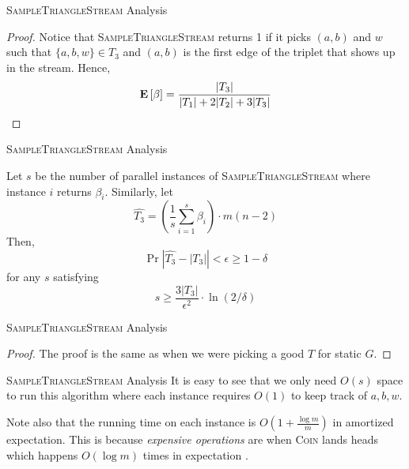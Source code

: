 \begin{frame}{\textsc{SampleTriangleStream} Analysis}
  \begin{proof}
    Notice that \textsc{SampleTriangleStream} returns 1 if it picks \((a, b)\)
    and \(w\) such that \(\{a, b, w\} \in T_3\) and \((a,
    b)\) is the first edge of the triplet that shows up in the stream. Hence,
    \[ \mathbf{E}\left[\beta\right] = \frac{|T_3|}{|T_1| + 2|T_2| + 3|T_3|} \]
  \end{proof}
\end{frame}

\begin{frame}{\textsc{SampleTriangleStream} Analysis}
  \begin{theorem}
    Let \(s\) be the number of parallel instances of
    \textsc{SampleTriangleStream} where instance \(i\) returns \(\beta_i\).
    Similarly, let
    \[ \hat{T_3} = \left(\frac{1}{s} \sum_{i=1}^s \beta_i\right) \cdot m(n-2) \]
    Then, 
    \[ \Pr{\left|\hat{T_3} - |T_3|\right| < \epsilon} \geq 1-\delta \]
    for any \(s\) satisfying
    \[
      s \geq \frac{3|T_3|}{\epsilon^2} \cdot \ln(2/\delta) 
    \]
  \end{theorem}
\end{frame}

\begin{frame}{\textsc{SampleTriangleStream} Analysis}
  \begin{proof}
    The proof is the same as when we were picking a good \(T\) for static \(G\).
  \end{proof}
\end{frame}

\begin{frame}{\textsc{SampleTriangleStream} Analysis}
  It is easy to see that we only need \(O(s)\) space to run this algorithm where
  each instance requires \(O(1)\) to keep track of \(a, b, w\).

  Note also that the running time on each instance is \(O\left(1 + \frac{\log m}{m}\right)\) in amortized expectation. This is because \textit{expensive operations} are when \textsc{Coin} lands heads which happens \textit{$O(\log m)$} times in expectation \cite{Buriol_Frahling_Leonardi_Marchetti-Spaccamela_Sohler_2006}.
\end{frame}
